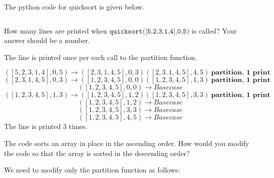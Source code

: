 \begin{prob}
    The python code for quicksort is given below.
    
    \inputminted{python}{\thisdir/include/part_a.py}
    
    \begin{subprobset}
    
            \begin{subprob}
                How many lines are printed when $\texttt{quicksort([5,2,3,1,4],0,5)}$ is called? Your answer should be a number.
               
                \begin{soln}
                    The line is printed once per each call to the partition function.
                    
                    $$([5,2,3,1,4],0,5) \rightarrow ([2,3,1,4,5],0,3)([2,3,1,4,5],4,5)~\textbf{partition, 1 print}$$
            		$$([2,3,1,4,5],0,3) \rightarrow ([1,2,3,4,5],0,0)([1,2,3,4,5],1,3)~\textbf{partition, 1 print}$$
            		$$([1,2,3,4,5],0,0) \rightarrow Base case$$
            		$$([1,2,3,4,5],1,3) \rightarrow ([1,2,3,4,5],1,2)([1,2,3,4,5],3,3)~\textbf{partition, 1 print}$$
            		$$([1,2,3,4,5],1,2) \rightarrow Base case$$
            		$$([1,2,3,4,5],3,3) \rightarrow Base case$$
            		$$([1,2,3,4,5],4,5) \rightarrow Base case$$
            		The line is printed 3 times.
                                
                \end{soln}
                
            \end{subprob}
            
            \begin{subprob}
                The code sorts an array in place in the ascending order. How would you modify the code so that the array is sorted in the descending order?
                
                We need to modify only the partition function as follows:
               
                \begin{soln}
                    \inputminted{python}{\thisdir/include/part_b_soln.py}
                \end{soln}
                
            \end{subprob}
            
    \end{subprobset}

\end{prob}
